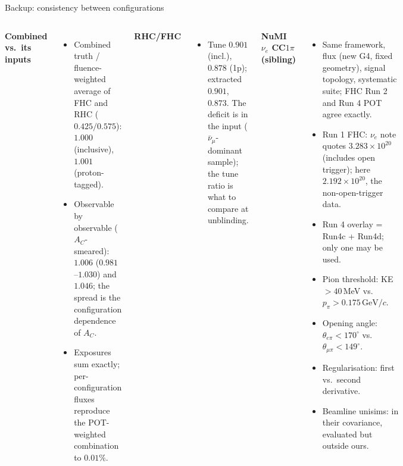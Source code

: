 \documentclass[aspectratio=169,10pt]{beamer}
\newcommand{\GeVc}{\,\text{GeV}/c}
\begin{document}
\begin{frame}{Backup: consistency between configurations}
  \begin{columns}[T]
  \small
  \textbf{Combined vs.\ its inputs}
  \begin{itemize}\scriptsize\setlength\itemsep{2pt}
    \item Combined truth / fluence-weighted average of FHC and RHC ($0.425/0.575$): $1.000$ (inclusive),
      $1.001$ (proton-tagged).
    \item Observable by observable ($A_C$-smeared): $1.006$ ($0.981$--$1.030$) and $1.046$; the spread is
      the configuration dependence of $A_C$.
    \item Exposures sum exactly; per-configuration fluxes reproduce the POT-weighted combination to $0.01\%$.
  \end{itemize}
  \textbf{RHC/FHC}
  \begin{itemize}\scriptsize\setlength\itemsep{2pt}
    \item Tune $0.901$ (incl.), $0.878$ (1p); extracted $0.901$, $0.873$. The deficit is in the input
      ($\bar\nu_\mu$-dominant sample); the tune ratio is what to compare at unblinding.
  \end{itemize}
  \small
  \textbf{NuMI $\nu_e$ CC$1\pi$ (sibling)}
  \begin{itemize}\scriptsize\setlength\itemsep{2pt}
    \item Same framework, flux (new G4, fixed geometry), signal topology, systematic suite; FHC Run 2 and Run 4 POT agree exactly.
    \item Run 1 FHC: $\nu_e$ note quotes $3.283\times10^{20}$ (includes open trigger); here $2.192\times10^{20}$, the non-open-trigger data.
    \item Run 4 overlay = Run4c + Run4d; only one may be used.
    \item Pion threshold: KE$>40$\,MeV vs.\ $p_\pi>0.175\GeVc$.
    \item Opening angle: $\theta_{e\pi}<170^\circ$ vs.\ $\theta_{\mu\pi}<149^\circ$.
    \item Regularisation: first vs.\ second derivative.
    \item Beamline unisims: in their covariance, evaluated but outside ours.
  \end{itemize}
  \end{columns}
\end{frame}
\end{document}
